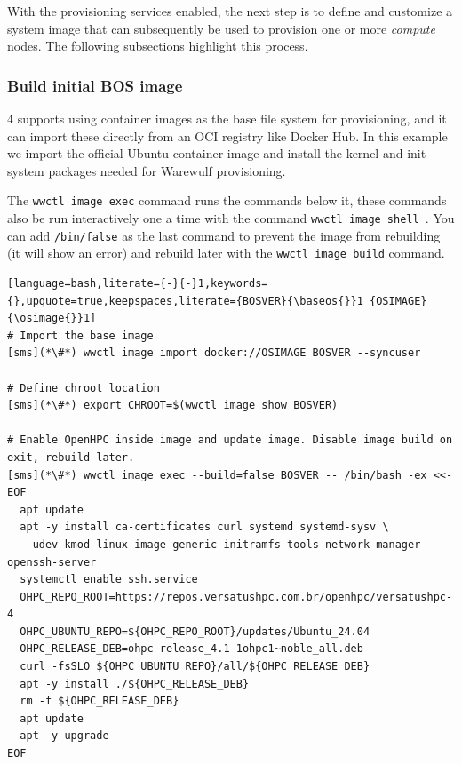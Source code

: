 With the provisioning services enabled, the next step is to define and
customize a system image that can subsequently be used to provision one or more
{\em compute} nodes. The following subsections highlight this process.

\subsubsection{Build initial BOS image} \label{sec:assemble_bos}
\Warewulf{} 4 supports using container images as the base file system for
provisioning, and it can import these directly from an OCI registry like
Docker Hub. In this example we import the official Ubuntu container image and
install the kernel and init-system packages needed for Warewulf provisioning.

The \texttt{wwctl image exec} command runs the commands below it, these commands
also be run interactively one a time with the command \texttt{wwctl image
shell \baseos{}}. You can add \texttt{/bin/false} as the last command to prevent
the image from rebuilding (it will show an error) and rebuild later with the
\texttt{wwctl image build} command.

\begin{lstlisting}[language=bash,literate={-}{-}1,keywords={},upquote=true,keepspaces,literate={BOSVER}{\baseos{}}1 {OSIMAGE}{\osimage{}}1]
# Import the base image
[sms](*\#*) wwctl image import docker://OSIMAGE BOSVER --syncuser

# Define chroot location
[sms](*\#*) export CHROOT=$(wwctl image show BOSVER)

# Enable OpenHPC inside image and update image. Disable image build on exit, rebuild later.
[sms](*\#*) wwctl image exec --build=false BOSVER -- /bin/bash -ex <<- EOF
  apt update
  apt -y install ca-certificates curl systemd systemd-sysv \
    udev kmod linux-image-generic initramfs-tools network-manager openssh-server
  systemctl enable ssh.service
  OHPC_REPO_ROOT=https://repos.versatushpc.com.br/openhpc/versatushpc-4
  OHPC_UBUNTU_REPO=${OHPC_REPO_ROOT}/updates/Ubuntu_24.04
  OHPC_RELEASE_DEB=ohpc-release_4.1-1ohpc1~noble_all.deb
  curl -fsSLO ${OHPC_UBUNTU_REPO}/all/${OHPC_RELEASE_DEB}
  apt -y install ./${OHPC_RELEASE_DEB}
  rm -f ${OHPC_RELEASE_DEB}
  apt update
  apt -y upgrade
EOF
\end{lstlisting}
